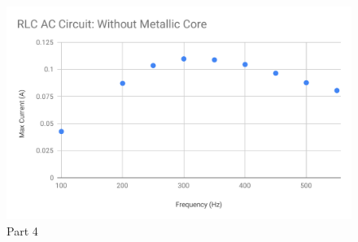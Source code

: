 %
\begin{figure}[ht]
	\centering
	\includegraphics[scale=0.74]{image/06-RLC/part-4.pdf}
	\caption{Part 4}
	\label{figure.06.part.4.f}
\end{figure}
%